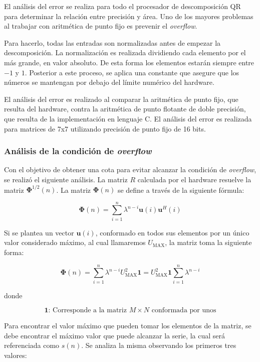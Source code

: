 El análisis del error se realiza para todo el procesador de descomposición QR para determinar la relación entre precisión y área. Uno de los mayores problemas al trabajar con aritmética de punto fijo es prevenir el \textit{overflow}.

Para hacerlo, todas las entradas son normalizadas antes de empezar la descomposición. La normalización es realizada dividiendo cada elemento por el más grande, en valor absoluto. De esta forma los elementos estarán siempre entre $-1$ y $1$. Posterior a este proceso, se aplica una constante que asegure que los números se mantengan por debajo del límite numérico del hardware.

El análisis del error es realizado al comparar la aritmética de punto fijo, que resulta del hardware, contra la aritmética de punto flotante de doble precisión, que resulta de la implementación en lenguaje C. El análisis del error es realizada para matrices de 7x7 utilizando precisión de punto fijo de 16 bits.

\subsubsection{Análisis de la condición de \textit{overflow}}

Con el objetivo de obtener una cota para evitar alcanzar la condición de \textit{overflow}, se realizó el siguiente análisis. La matriz $R$ calculada por el hardware resuelve la matriz $\mathbf{\Phi}^{1/2}(n)$. La matriz $\mathbf{\Phi}(n)$ se define a través de la siguiente fórmula:

\begin{equation}
\mathbf{\Phi}(n) = \sum_{i=1}^n \lambda^{n-i} \mathbf{u}(i) \mathbf{u}^H(i)
\end{equation}

Si se plantea un vector $\mathbf{u}(i)$, conformado en todos sus elementos por un único valor considerado máximo, al cual llamaremos $U_{\text{MAX}}$, la matriz toma la siguiente forma:

\begin{equation}
\label{eq:max_phi_1}
\mathbf{\Phi}(n) = \sum_{i=1}^n \lambda^{n-i} U_{\text{MAX}}^2 \mathbf{1} = 
                   U_{\text{MAX}}^2 \mathbf{1} \sum_{i=1}^n \lambda^{n-i}
\end{equation}

donde

\[
\mathbf{1} \text{: Corresponde a la matriz } M \times N \text{ conformada por unos}
\]

Para encontrar el valor máximo que pueden tomar los elementos de la matriz, se debe encontrar el máximo valor que puede alcanzar la serie, la cual será referenciada como $s(n)$. Se analiza la misma observando los primeros tres valores:


